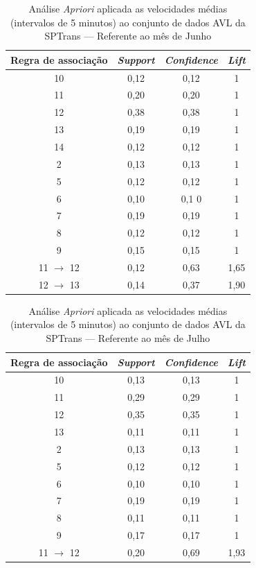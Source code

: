 \documentclass[
	12pt,				%
	oneside,			%
	a4paper,			%
	english,			%
	brazil				%
	]{abntex2ppgsi}
\begin{document}
{{{\begin{apendicesenv}
\begin{table}[!htb]
\centering
\caption {Análise \textit{Apriori} aplicada as velocidades médias (intervalos de 5 minutos) ao conjunto de dados AVL da SPTrans --- Referente ao mês de Junho}
\label {tab:aprioriJune}
\begin{tabular}{c|c|c|c}
\toprule
\textbf{Regra de associação} & \textit{\textbf{Support}} & \textit{\textbf{Confidence}} & \textit{\textbf{Lift}} \\
\midrule
10 &  0,12 &  0,12 &  1\\
\hline
11 &  0,20 &  0,20 &  1\\
\hline
12 &  0,38 &  0,38 &  1\\
\hline
13 &  0,19 &  0,19 &  1\\
\hline
14 &  0,12 &  0,12 &  1\\
\hline
2 &  0,13 &  0,13 &  1\\
\hline
5 &  0,12 &  0,12 &  1\\
\hline
6 &  0,10 &  0,1 0&  1\\
\hline
7 &  0,19 &  0,19 &  1\\
\hline
8 &  0,12 &  0,12 &  1\\
\hline
9 &  0,15 &  0,15 &  1\\
\hline
11 $\rightarrow$ 12 &  0,12 &  0,63 &  1,65\\
\hline
12 $\rightarrow$ 13 &  0,14 &  0,37 &  1,90\\
\bottomrule
\end{tabular}
\end{table}

\begin{table}[!htb]
\centering
\caption {Análise \textit{Apriori} aplicada as velocidades médias (intervalos de 5 minutos) ao conjunto de dados AVL da SPTrans --- Referente ao mês de Julho}
\label {tab:aprioriJuly}
\begin{tabular}{c|c|c|c}
\toprule
\textbf{Regra de associação} & \textit{\textbf{Support}} & \textit{\textbf{Confidence}} & \textit{\textbf{Lift}} \\
\midrule
10 &  0,13 &  0,13 &  1\\
\hline
11 &  0,29 &  0,29 &  1\\
\hline
12 &  0,35 &  0,35 &  1\\
\hline
13 &  0,11 &  0,11 &  1\\
\hline
2 &  0,13 &  0,13 &  1\\
\hline
5 &  0,12 &  0,12 &  1\\
\hline
6 &  0,10 &  0,10 &  1\\
\hline
7 &  0,19 &  0,19 &  1\\
\hline
8 &  0,11 &  0,11 &  1\\
\hline
9 &  0,17 &  0,17 &  1\\
\hline
11 $\rightarrow$ 12 &  0,20 &  0,69 &  1,93\\
\bottomrule
\end{tabular}
\end{table}


\end{apendicesenv}}}}
\end{document}
